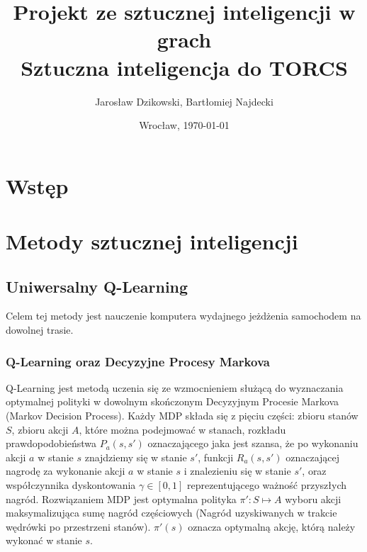 \documentclass{article}
\author{Jarosław Dzikowski, Bartłomiej Najdecki}
\date{Wrocław, \today}
\title{\textbf{Projekt ze sztucznej inteligencji w grach} \\  Sztuczna inteligencja do TORCS}
\begin{document}
\maketitle
\section{Wstęp}


\section{Metody sztucznej inteligencji}

\subsection{Uniwersalny Q-Learning}

Celem tej metody jest nauczenie komputera wydajnego jeżdżenia samochodem na dowolnej trasie.

\subsubsection{Q-Learning oraz Decyzyjne Procesy Markova}
Q-Learning jest metodą uczenia się ze wzmocnieniem służącą do wyznaczania optymalnej polityki w dowolnym skończonym Decyzyjnym Procesie Markova (Markov Decision Process). Każdy MDP składa się z pięciu części: zbioru stanów $S$, zbioru akcji $A$, które można podejmować w stanach, rozkładu prawdopodobieństwa $P_a(s, s')$ oznaczającego jaka jest szansa, że po wykonaniu akcji $a$ w stanie $s$ znajdziemy się w stanie $s'$, funkcji $R_a(s,s')$ oznaczającej nagrodę za wykonanie akcji $a$ w stanie $s$ i znalezieniu się w stanie $s'$, oraz współczynnika dyskontowania $\gamma \in [0,1]$ reprezentującego ważność przyszłych nagród. Rozwiązaniem MDP jest optymalna polityka $\pi' : S \mapsto A$ wyboru akcji maksymalizująca sumę nagród częściowych (Nagród uzyskiwanych w trakcie wędrówki po przestrzeni stanów). $\pi'(s)$ oznacza optymalną akcję, którą należy wykonać w stanie $s$.
\end{document}
